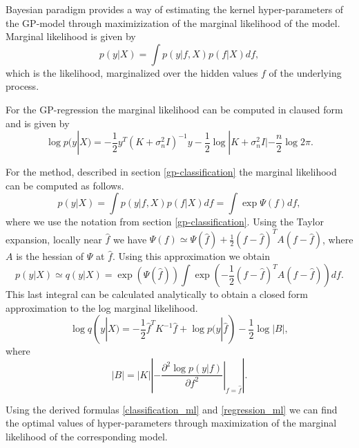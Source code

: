 Bayesian paradigm provides a way of estimating the kernel hyper-parameters of the GP-model through maximizization of the marginal likelihood of the model. Marginal likelihood is given by
	$$p(y | X) = \int p(y | f, X) p(f | X) df,$$
	which is the likelihood, marginalized over the hidden values $f$ of the underlying process.

	For the GP-regression the marginal likelihood can be computed in claused form and is given by
	\begin{equation}
		\label{regression_ml}
		\log p(y | X) = -\frac 1 2 y^{T} (K + \sigma_n^2 I)^{-1} y - \frac 1 2 \log |K + \sigma_n^2 I| - \frac n 2 \log 2 \pi.
	\end{equation}

	For the method, described in section \ref{gp-classification} the marginal likelihood can be computed as follows.
	$$p(y | X) = \int p(y | f, X) p(f | X) df = \int \exp{\Psi(f)} df,$$
	where we use the notation from section \ref{gp-classification}. Using the Taylor expansion, locally near $\hat f$ we have $\Psi(f) \simeq \Psi(\hat f) + \frac 1 2(f - \hat f)^T A (f - \hat f)$, where $A$ is the hessian of $\Psi$ at $\hat f$. Using this approximation we obtain
	$$p(y | X) \simeq q(y | X) = \exp(\Psi(\hat f)) \int \exp( - \frac 1 2 (f - \hat f)^T A (f - \hat f)) df.$$
	This last integral can be calculated analytically to obtain a closed form approximation to the log marginal likelihood. 
	\begin{equation}
		\label{classification_ml}
		\log q(y|X) = -\frac 1 2 \hat f^T K^{-1} \hat f + \log p(y|\hat f) - \frac 1 2 \log|B|,
	\end{equation}
	where 
	$$|B| = |K| \left|- \left. \frac{\partial^2 \log p(y | f)}{\partial f^2} \right|_{f = \hat f} \right|.$$ 

	Using the derived formulas \ref{classification_ml} and \ref{regression_ml} we can find the optimal values of hyper-parameters through maximization of the marginal likelihood of the corresponding model.